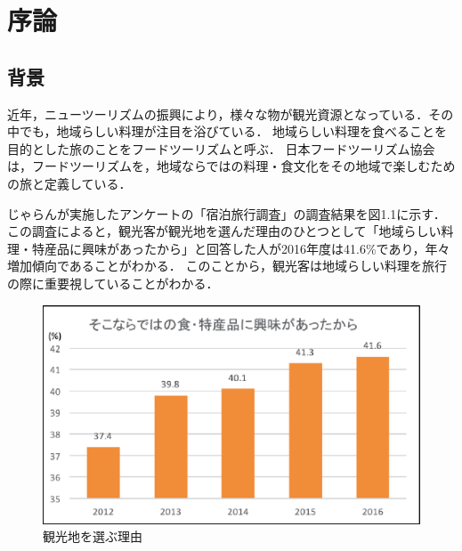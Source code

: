 \documentclass{funthesis}
\begin{document}
\tableofcontents %






\chapter{序論} 

\section{背景}
近年，ニューツーリズムの振興\cite{1}により，様々な物が観光資源となっている．その中でも，地域らしい料理が注目を浴びている．
地域らしい料理を食べることを目的とした旅のことをフードツーリズムと呼ぶ．
日本フードツーリズム協会\cite{2} は，フードツーリズムを，地域ならではの料理・食文化をその地域で楽しむための旅と定義している．

じゃらんが実施したアンケートの「宿泊旅行調査」の調査結果を図1.1に示す\cite{3}．
この調査によると，観光客が観光地を選んだ理由のひとつとして「地域らしい料理・特産品に興味があったから」と回答した人が2016年度は41.6\%であり，年々増加傾向であることがわかる．
このことから，観光客は地域らしい料理を旅行の際に重要視していることがわかる．

\begin{figure}[tbp]
  \begin{center}
    \includegraphics[clip,width=13cm]{jaran.eps}
    \caption{観光地を選ぶ理由}
  \end{center}
\end{figure}
\end{document}
